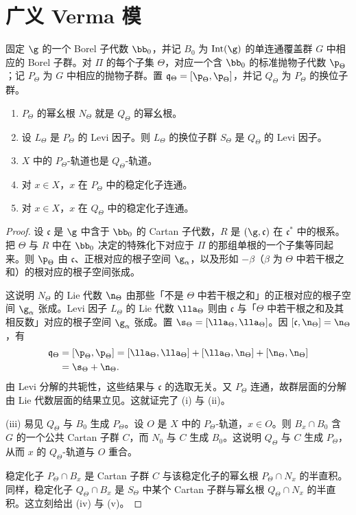 \section{广义 Verma 模}
\label{sec:06.6.2}

固定 $\g$ 的一个 Borel 子代数 $\bb_0$，并记 $B_0$ 为 $\operatorname{Int}(\g)$ 的单连通覆盖群 $G$ 中相应的 Borel 子群。对 $\Pi$ 的每个子集 $\Theta$，对应一个含 $\bb_0$ 的标准抛物子代数 $\p_\Theta$；记 $P_\Theta$ 为 $G$ 中相应的抛物子群。置 $\mathfrak{q}_\Theta=[\p_\Theta,\p_\Theta]$，并记 $Q_\Theta$ 为 $P_\Theta$ 的换位子群。

\begin{lemma}\label{lem:06.2.1}
\begin{enumerate}[label=(\roman*)]
\item $P_\Theta$ 的幂幺根 $N_\Theta$ 就是 $Q_\Theta$ 的幂幺根。
\item 设 $L_\Theta$ 是 $P_\Theta$ 的 Levi 因子。则 $L_\Theta$ 的换位子群 $S_\Theta$ 是 $Q_\Theta$ 的 Levi 因子。
\item $X$ 中的 $P_\Theta$-轨道也是 $Q_\Theta$-轨道。
\item 对 $x\in X$，$x$ 在 $P_\Theta$ 中的稳定化子连通。
\item 对 $x\in X$，$x$ 在 $Q_\Theta$ 中的稳定化子连通。
\end{enumerate}
\end{lemma}

\begin{proof}
设 $\mathfrak{c}$ 是 $\g$ 中含于 $\bb_0$ 的 Cartan 子代数，$R$ 是 $(\g,\mathfrak{c})$ 在 $\mathfrak{c}^*$ 中的根系。把 $\Theta$ 与 $R$ 中在 $\bb_0$ 决定的特殊化下对应于 $\Pi$ 的那组单根的一个子集等同起来。则 $\p_\Theta$ 由 $\mathfrak{c}$、正根对应的根子空间 $\g_\alpha$，以及形如 $-\beta$（$\beta$ 为 $\Theta$ 中若干根之和）的根对应的根子空间张成。

这说明 $N_\Theta$ 的 Lie 代数 $\n_\Theta$ 由那些「不是 $\Theta$ 中若干根之和」的正根对应的根子空间 $\g_\alpha$ 张成。Levi 因子 $L_\Theta$ 的 Lie 代数 $\lla_\Theta$ 则由 $\mathfrak{c}$ 与「$\Theta$ 中若干根之和及其相反数」对应的根子空间 $\g_\alpha$ 张成。置 $\s_\Theta=[\lla_\Theta,\lla_\Theta]$。因 $[\mathfrak{c},\n_\Theta]=\n_\Theta$，有
\begin{align*}
\mathfrak{q}_\Theta&=[\p_\Theta,\p_\Theta]=[\lla_\Theta,\lla_\Theta]+[\lla_\Theta,\n_\Theta]+[\n_\Theta,\n_\Theta]\\
&=\s_\Theta+\n_\Theta.
\end{align*}
由 Levi 分解的共轭性，这些结果与 $\mathfrak{c}$ 的选取无关。又 $P_\Theta$ 连通，故群层面的分解由 Lie 代数层面的结果立见。这就证完了 (i) 与 (ii)。

(iii) 易见 $Q_\Theta$ 与 $B_0$ 生成 $P_\Theta$。设 $O$ 是 $X$ 中的 $P_\Theta$-轨道，$x\in O$。则 $B_x\cap B_0$ 含 $G$ 的一个公共 Cartan 子群 $C$，而 $N_0$ 与 $C$ 生成 $B_0$。这说明 $Q_\Theta$ 与 $C$ 生成 $P_\Theta$，从而 $x$ 的 $Q_\Theta$-轨道与 $O$ 重合。

稳定化子 $P_\Theta\cap B_x$ 是 Cartan 子群 $C$ 与该稳定化子的幂幺根 $P_\Theta\cap N_x$ 的半直积。同样，稳定化子 $Q_\Theta\cap B_x$ 是 $S_\Theta$ 中某个 Cartan 子群与幂幺根 $Q_\Theta\cap N_x$ 的半直积。这立刻给出 (iv) 与 (v)。
\end{proof}

